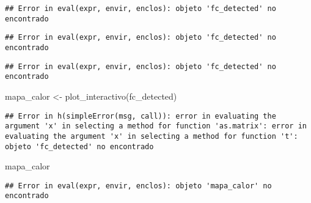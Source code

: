 \documentclass[
]{book}
\newenvironment{Shaded}{\begin{snugshade}}{\end{snugshade}}
\newcommand{\FunctionTok}[1]{\textcolor[rgb]{0.00,0.00,0.00}{#1}}
\newcommand{\NormalTok}[1]{#1}
\newcommand{\OtherTok}[1]{\textcolor[rgb]{0.56,0.35,0.01}{#1}}
\newcommand{\SpecialCharTok}[1]{\textcolor[rgb]{0.00,0.00,0.00}{#1}}
\begin{document}
\begin{verbatim}
## Error in eval(expr, envir, enclos): objeto 'fc_detected' no encontrado
\end{verbatim}

\begin{Shaded}
\end{Shaded}

\begin{verbatim}
## Error in eval(expr, envir, enclos): objeto 'fc_detected' no encontrado
\end{verbatim}

\begin{Shaded}
\end{Shaded}

\begin{verbatim}
## Error in eval(expr, envir, enclos): objeto 'fc_detected' no encontrado
\end{verbatim}

\begin{Shaded}
\begin{Highlighting}[]
\NormalTok{mapa\_calor }\OtherTok{\textless{}{-}} \FunctionTok{plot\_interactivo}\NormalTok{(fc\_detected)}
\end{Highlighting}
\end{Shaded}

\begin{verbatim}
## Error in h(simpleError(msg, call)): error in evaluating the argument 'x' in selecting a method for function 'as.matrix': error in evaluating the argument 'x' in selecting a method for function 't': objeto 'fc_detected' no encontrado
\end{verbatim}

\begin{Shaded}
\begin{Highlighting}[]
\NormalTok{mapa\_calor}
\end{Highlighting}
\end{Shaded}

\begin{verbatim}
## Error in eval(expr, envir, enclos): objeto 'mapa_calor' no encontrado
\end{verbatim}
\end{document}

